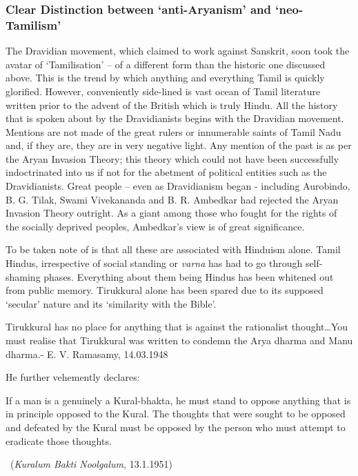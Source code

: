 \subsubsection*{Clear Distinction between ‘anti-Aryanism’ and ‘neo-Tamilism’}

\vskip -5pt

The Dravidian movement, which claimed to work against Sanskrit, soon took the avatar of ‘Tamilisation’ – of a different form than the historic one discussed above. This is the trend by which anything and everything Tamil is quickly glorified. However, conveniently side-lined is vast ocean of Tamil literature written prior to the advent of the British which is truly Hindu. All the history that is spoken about by the Dravidianists begins with the Dravidian movement. Mentions are not made of the great rulers or innumerable saints of Tamil Nadu and, if they are, they are in very negative light. Any mention of the past is as per the Aryan Invasion Theory; this theory which could not have been successfully indoctrinated into us if not for the abetment of political entities such as the Dravidianists. Great people – even as Dravidianism began - including Aurobindo, B. G. Tilak, Swami Vivekananda and B. R. Ambedkar had rejected the Aryan Invasion Theory outright. As a giant among those who fought for the rights of the socially deprived peoples, Ambedkar’s view is of great significance. 

To be taken note of is that all these are associated with Hinduism alone. Tamil Hindus, irrespective of social standing or \textit{varna} has had to go through self-shaming phases. Everything about them being Hindus has been whitened out from public memory. Tirukkural alone has been spared due to its supposed ‘secular’ nature and its ‘similarity with the Bible’.

\begin{myquote}
Tirukkural has no place for anything that is against the rationalist thought…You must realise that Tirukkural was written to condemn the Arya dharma and Manu dharma.\hfill - E. V. Ramasamy, 14.03.1948
\end{myquote}

He further vehemently declares:

\begin{myquote}
If a man is a genuinely a Kural-bhakta, he must stand to oppose anything that is in principle opposed to the Kural. The thoughts that were sought to be opposed and defeated by the Kural must be opposed by the person who must attempt to eradicate those thoughts.

~\hfill (\textit{Kuralum Bakti Noolgalum}, 13.1.1951)
\end{myquote}

